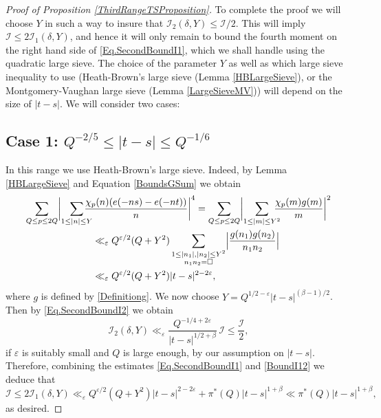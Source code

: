 \documentclass[JEP,XML,SOM,Unicode,NoFloatCountersInSection,published]{cedram}
\theoremstyle{plain}
\theoremstyle{definition}
\let\ep\varepsilon
\begin{document}
\begin{proof}[Proof of Proposition \ref{ThirdRangeTSProposition}]
To complete the proof we will choose $Y$ in such a way to insure that $\mathcal{I}_2(\delta, Y)\leq \mathcal{I}/2$. This will imply $\mathcal{I}\leq 2\mathcal{I}_1(\delta, Y)$, and hence it will only remain to bound the fourth moment on the right hand side of \eqref{Eq.SecondBoundI1}, which we shall handle using the quadratic large sieve. The choice of the parameter $Y$ as well as which large sieve inequality to use (Heath-Brown's large sieve (Lemma \ref{HBLargeSieve}), or the Montgomery-Vaughan large sieve (Lemma \ref{LargeSieveMV})) will depend on the size of $|t-s|$. We will consider two cases:
\subsection*{Case 1: $Q^{-2/5}\leq |t-s|\leq Q^{-1/6}$}
In this range we use Heath-Brown's large sieve. Indeed,
by Lemma \ref{HBLargeSieve} and Equation \eqref{BoundsGSum} we obtain
\begin{align}\label{BoundI12}
\sum_{Q\leq p\leq 2Q} \biggl|\sum_{1\leq |n|\leq Y}&\hspace*{-3mm} \frac{\chi_p(n) (e(-ns)-e(-nt))}{n} \biggr|^4= \sum_{Q\leq p\leq 2Q} \biggl|\sum_{1\leq |m|\leq Y^2}\hspace*{-3mm} \frac{\chi_p(m)g(m)}{m} \biggr|^2 \\
&\ll_{\ep} Q^{\ep/2} (Q+Y^2) \sum_{\substack{1\leq |n_1|, |n_2|\leq Y^2\\ n_1n_2=\square}} \Bigl|\frac{g(n_1)g(n_2)}{n_1n_2}\Bigr| \\
&\ll_{\ep} Q^{\ep/2} (Q+Y^2) |t-s|^{2-2\ep} \nonumber,
\end{align}
where $g$ is defined by \eqref{Definitiong}.
We now choose $Y=Q^{1/2-\ep}|t-s|^{(\beta-1)/2}$. Then by \eqref{Eq.SecondBoundI2} we obtain
\[
\mathcal{I}_2(\delta, Y) \ll_{\ep} \frac{Q^{-1/4+2\ep}} {|t-s|^{1/2+\beta}}\, \mathcal{I} \leq \frac{\mathcal{I}}{2}, \]
if $\ep$ is suitably small and $Q$ is large enough, by our assumption on $|t-s|$.
Therefore, combining the estimates \eqref{Eq.SecondBoundI1} and \eqref{BoundI12} we deduce that
\begin{equation}\label{BoundI0}
\mathcal{I}\leq 2 \mathcal{I}_1(\delta, Y)\ll_{\ep} Q^{\ep/2} (Q+Y^2) |t-s|^{2-2\ep} + \pi^*(Q)|t-s|^{1+\beta} \ll\pi^*(Q)|t-s|^{1+\beta},
\end{equation}
as desired.

\end{proof}
\end{document}
